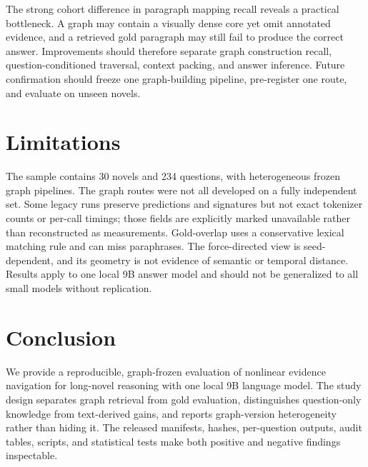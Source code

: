 \documentclass[11pt,a4paper]{article}
\begin{document}
The strong cohort difference in paragraph mapping recall reveals a practical bottleneck. A graph may contain a visually dense core yet omit annotated evidence, and a retrieved gold paragraph may still fail to produce the correct answer. Improvements should therefore separate graph construction recall, question-conditioned traversal, context packing, and answer inference. Future confirmation should freeze one graph-building pipeline, pre-register one route, and evaluate on unseen novels.

\section{Limitations}
The sample contains 30 novels and 234 questions, with heterogeneous frozen graph pipelines. The graph routes were not all developed on a fully independent set. Some legacy runs preserve predictions and signatures but not exact tokenizer counts or per-call timings; those fields are explicitly marked unavailable rather than reconstructed as measurements. Gold-overlap uses a conservative lexical matching rule and can miss paraphrases. The force-directed view is seed-dependent, and its geometry is not evidence of semantic or temporal distance. Results apply to one local 9B answer model and should not be generalized to all small models without replication.

\section{Conclusion}
We provide a reproducible, graph-frozen evaluation of nonlinear evidence navigation for long-novel reasoning with one local 9B language model. The study design separates graph retrieval from gold evaluation, distinguishes question-only knowledge from text-derived gains, and reports graph-version heterogeneity rather than hiding it. The released manifests, hashes, per-question outputs, audit tables, scripts, and statistical tests make both positive and negative findings inspectable.



\end{document}
